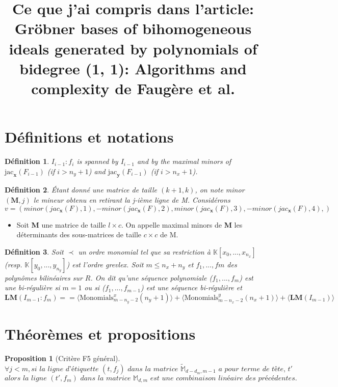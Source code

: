 \documentclass[french]{article}
\title{Ce que j'ai compris dans l'article: Gröbner bases of bihomogeneous ideals generated by polynomials of bidegree (1, 1): Algorithms and complexity de Faugère et al.}
\newtheorem{proposition}{Proposition}[section]
\newtheorem{definition}{Définition}[section]
\newcommand{\propositionTitre}[2]{
	\begin{proposition}[#1]
		#2
	\end{proposition}
}
\begin{document}
\maketitle

\section{Définitions et notations}
\begin{definition}
\item $I_{i-1}:f_i$ is spanned by $I_{i-1}$ and by the maximal minors of $\text{jac}_{\textbf{x}}(F_{i-1})$ (if $i > n_y + 1$) and $\text{jac}_{\textbf{y}}(F_{i-1})$ (if $i > n_x + 1$).
\end{definition}

\begin{definition}
Étant donné une matrice de taille $(k+1, k)$, on note minor$(\textbf{M}, j)$ le mineur obtenu en retirant la j-ième ligne de M. Considérons
$$v = (minor(jac_\textbf{x}(F), 1), -minor(jac_\textbf{x}(F), 2),
minor(jac_\textbf{x}(F), 3), -minor(jac_\textbf{x}(F), 4),)$$
\end{definition}

\begin{itemize}
	\item Soit \textbf{M} une matrice de taille $l \times c$. On appelle maximal 
	minors de \textbf{M} les déterminants des sous-matrices de taille $c \times c$
	de M.
\end{itemize}

\begin{definition}
	Soit $\prec$ un ordre monomial tel que sa restriction à 
	$\mathbb{K}[x_0,...,x_{n_x}]$ (resp. $\mathbb{K}[y_0,...,y_{n_y}]$)
	est l'ordre \textit{grevlex}. Soit $m \leq n_x + n_y$ et $f_1,...,fm$
	des polynômes bilinéaires sur $\mathit{R}$. On dit qu'une séquence polynomiale
	($f_1,...,f_m$) est une bi-régulière si $m = 1$ ou si ($f_1,...,f_{m-1}$)
	est une séquence bi-régulière et
	$$\textbf{LM}(I_{m-1}:f_m) == \langle\text{Monomials}^{x}_{m - n_y - 2}
	(n_y + 1)\rangle + \langle\text{Monomials}^{y}_{m - n_x - 2}
	(n_x + 1)\rangle + \langle\textbf{LM}(I_{m-1})\rangle$$
\end{definition}

\section{Théorèmes et propositions}
\propositionTitre{Critère F5 général}{
$$\forall j < m, \textit{si la ligne d'étiquette }(t,f_j) \textit{ dans la matrice } 
\tilde{\mathbb{M}}_{d-d_m, m-1} \textit{ a pour terme de tête, } t'$$
$$	\textit{alors la ligne } 
(t', f_m) \textit{ dans la matrice } \mathbb{M}_{d, m} \textit{ est une combinaison linéaire des précédentes.}$$
}
\end{document}
